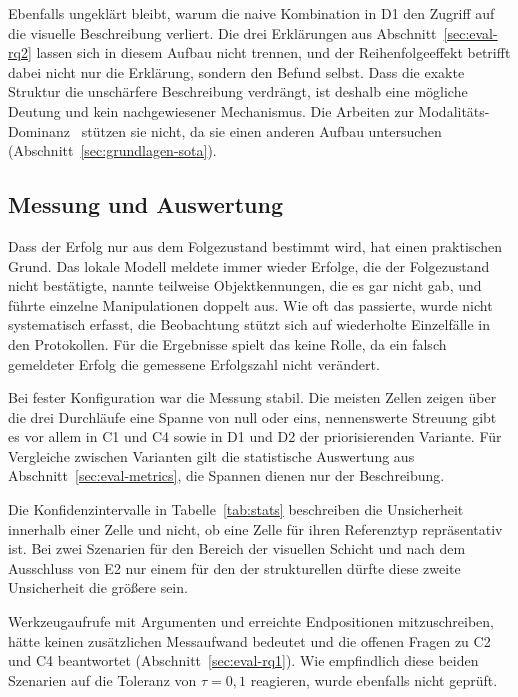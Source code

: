 Ebenfalls ungeklärt bleibt, warum die naive Kombination in D1 den Zugriff auf die visuelle Beschreibung verliert.
Die drei Erklärungen aus Abschnitt~\ref{sec:eval-rq2} lassen sich in diesem Aufbau nicht trennen, und der Reihenfolgeeffekt betrifft dabei nicht nur die Erklärung, sondern den Befund selbst.
Dass die exakte Struktur die unschärfere Beschreibung verdrängt, ist deshalb eine mögliche Deutung und kein nachgewiesener Mechanismus.
Die Arbeiten zur Modalitäts-Dominanz~\cite{deng2025, wu2025} stützen sie nicht, da sie einen anderen Aufbau untersuchen (Abschnitt~\ref{sec:grundlagen-sota}).

\subsection*{Messung und Auswertung}

Dass der Erfolg nur aus dem Folgezustand bestimmt wird, hat einen praktischen Grund.
Das lokale Modell meldete immer wieder Erfolge, die der Folgezustand nicht bestätigte, nannte teilweise Objektkennungen, die es gar nicht gab, und führte einzelne Manipulationen doppelt aus.
Wie oft das passierte, wurde nicht systematisch erfasst, die Beobachtung stützt sich auf wiederholte Einzelfälle in den Protokollen.
Für die Ergebnisse spielt das keine Rolle, da ein falsch gemeldeter Erfolg die gemessene Erfolgszahl nicht verändert.

Bei fester Konfiguration war die Messung stabil.
Die meisten Zellen zeigen über die drei Durchläufe eine Spanne von null oder eins, nennenswerte Streuung gibt es vor allem in C1 und C4 sowie in D1 und D2 der priorisierenden Variante.
Für Vergleiche zwischen Varianten gilt die statistische Auswertung aus Abschnitt~\ref{sec:eval-metrics}, die Spannen dienen nur der Beschreibung.

Die Konfidenzintervalle in Tabelle~\ref{tab:stats} beschreiben die Unsicherheit innerhalb einer Zelle und nicht, ob eine Zelle für ihren Referenztyp repräsentativ ist.
Bei zwei Szenarien für den Bereich der visuellen Schicht und nach dem Ausschluss von E2 nur einem für den der strukturellen dürfte diese zweite Unsicherheit die größere sein.

Werkzeugaufrufe mit Argumenten und erreichte Endpositionen mitzuschreiben, hätte keinen zusätzlichen Messaufwand bedeutet und die offenen Fragen zu C2 und C4 beantwortet (Abschnitt~\ref{sec:eval-rq1}).
Wie empfindlich diese beiden Szenarien auf die Toleranz von $\tau = 0{,}1$ reagieren, wurde ebenfalls nicht geprüft.

